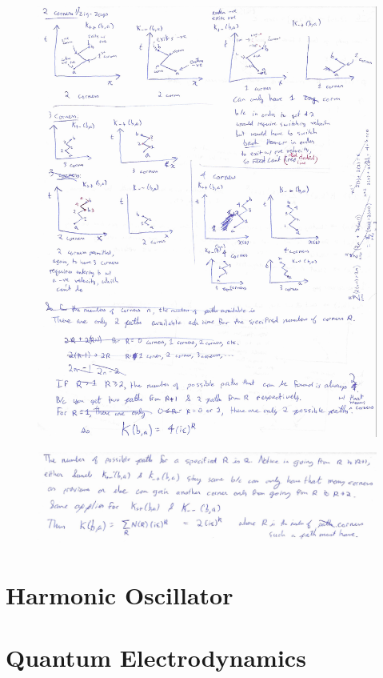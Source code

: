 \documentclass{article}
\begin{document}
\begin{figure}[t]
\includegraphics[width=15cm]{FeynmanQ2dash6p2.png}
\end{figure}

\begin{figure}[t]
\includegraphics[width=15cm]{FeynmanQ2dash6p3.png}
\end{figure}

\section{Harmonic Oscillator}

\section{Quantum Electrodynamics}
\end{document}
